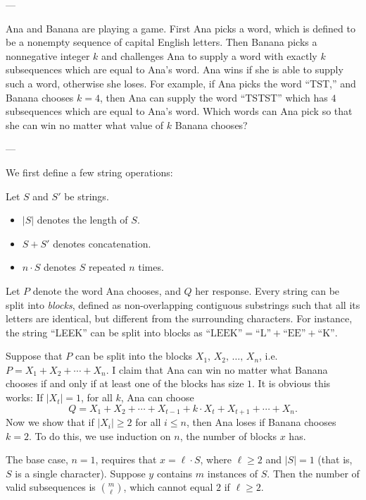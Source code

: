 
---

Ana and Banana are playing a game. First Ana picks a word, which is defined to be a nonempty sequence of capital English letters. Then Banana picks a nonnegative integer $k$ and challenges Ana to supply a word with exactly $k$ subsequences which are equal to Ana's word. Ana wins if she is able to supply such a word, otherwise she loses. For example, if Ana picks the word ``TST,'' and Banana chooses $k=4$, then Ana can supply the word ``TSTST'' which has $4$ subsequences which are equal to Ana's word. Which words can Ana pick so that she can win no matter what value of $k$ Banana chooses?

---

We first define a few string operations:
\begin{boxdef*}
    Let $S$ and $S'$ be strings.
    \begin{itemize}[itemsep=0em]
        \item $|S|$ denotes the length of $S$.
        \item $S+S'$ denotes concatenation.
        \item $n\cdot S$ denotes $S$ repeated $n$ times.
    \end{itemize}
\end{boxdef*}
Let $P$ denote the word Ana chooses, and $Q$ her response. Every string can be split into \textit{blocks}, defined as non-overlapping contiguous substrings such that all its letters are identical, but different from the surrounding characters. For instance, the string ``LEEK'' can be split into blocks as $\text{``LEEK''}=\text{``L''}+\text{``EE''}+\text{``K''}$.

Suppose that $P$ can be split into the blocks $X_1,\,X_2,\,\ldots,\,X_n$, i.e. $P=X_1+X_2+\cdots+X_n$. I claim that Ana can win no matter what Banana chooses if and only if at least one of the blocks has size $1$. It is obvious this works: If $|X_t|=1$, for all $k$, Ana can choose \[Q=X_1+X_2+\cdots+X_{t-1}+k\cdot X_t+X_{t+1}+\cdots+X_n.\]
Now we show that if $|X_i|\ge2$ for all $i\le n$, then Ana loses if Banana chooses $k=2$. To do this, we use induction on $n$, the number of blocks $x$ has.

The base case, $n=1$, requires that $x=\ell\cdot S$, where $\ell\ge2$ and $|S|=1$ (that is, $S$ is a single character). Suppose $y$ contains $m$ instances of $S$. Then the number of valid subsequences is $\binom m\ell$, which cannot equal $2$ if $\ell\ge2$.

